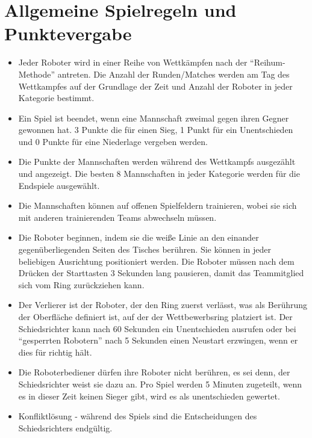 \documentclass[a4paper,12pt]{article}
\begin{document}
\section{Allgemeine Spielregeln und Punktevergabe}
\begin{itemize}
	\item Jeder Roboter wird in einer Reihe von Wettkämpfen nach der
		"`Reihum-Methode"' antreten. Die Anzahl der Runden/Matches
		werden am Tag des Wettkampfes auf der Grundlage der Zeit und
		Anzahl der Roboter in jeder Kategorie bestimmt.
	\item Ein Spiel ist beendet, wenn eine Mannschaft zweimal gegen ihren
		Gegner gewonnen hat. 3 Punkte die für einen Sieg, 1 Punkt für
		ein Unentschieden und 0 Punkte für eine Niederlage vergeben
		werden.
	\item Die Punkte der Mannschaften werden während des Wettkampfs
		ausgezählt und angezeigt. Die besten 8 Mannschaften in jeder
		Kategorie werden für die Endspiele ausgewählt.
	\item Die Mannschaften können auf offenen Spielfeldern trainieren,
		wobei sie sich mit anderen trainierenden Teams abwechseln
		müssen.
	\item Die Roboter beginnen, indem sie die weiße Linie an den einander
		gegenüberliegenden Seiten des Tisches berühren. Sie können in
		jeder beliebigen Ausrichtung positioniert werden. Die Roboter
		müssen nach dem Drücken der Starttasten 3 Sekunden lang
		pausieren, damit das Teammitglied sich vom Ring zurückziehen
		kann.
	\item Der Verlierer ist der Roboter, der den Ring zuerst verlässt, was
		als Berührung der Oberfläche definiert ist, auf der der
		Wettbewerbsring platziert ist. Der Schiedsrichter kann nach 60
		Sekunden ein Unentschieden ausrufen oder bei "`gesperrten
		Robotern"' nach 5 Sekunden einen Neustart erzwingen, wenn er
		dies für richtig hält.
	\item Die Roboterbediener dürfen ihre Roboter nicht berühren, es sei
		denn, der Schiedsrichter weist sie dazu an. Pro Spiel werden 5
		Minuten zugeteilt, wenn es in dieser Zeit keinen Sieger gibt,
		wird es als unentschieden gewertet.
	\item Konfliktlösung - während des Spiels sind die Entscheidungen des
		Schiedsrichters endgültig.
\end{itemize}
\end{document}
